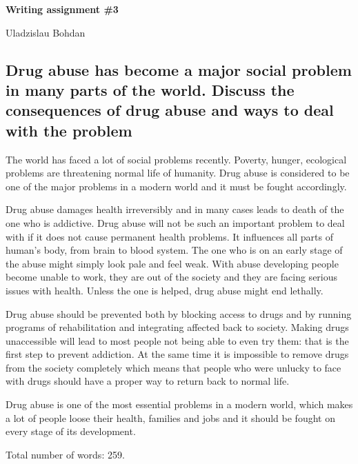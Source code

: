 \documentclass[12pt]{article}
\begin{document}
{\Large

\textbf{Writing assignment \#3}

Uladzislau Bohdan

}

\vspace{10mm}

\subsection*{Drug abuse has become a major social problem in many parts of the
world. Discuss the consequences of drug abuse and ways to deal with the problem}

The world has faced a lot of social problems recently. Poverty, hunger, ecological
problems are threatening normal life of humanity. Drug abuse is considered to be one
of the major problems in a modern world and it must be fought accordingly.

Drug abuse damages health irreversibly and in many cases leads to death of
the one who is addictive. Drug abuse will not be such an important problem
to deal with if it does not cause permanent health problems. It influences all
parts of human's body, from brain to blood system. The one who is on an early
stage of the abuse might simply look pale and feel weak. With abuse developing
people become unable to work, they are out of the society and they are facing
serious issues with health. Unless the one is helped, drug abuse might end lethally.

Drug abuse should be prevented both by blocking access to drugs and by running
programs of rehabilitation and integrating affected back to society.
Making drugs unaccessible will lead to most people not being able to even try
them: that is the first step to prevent addiction. At the same time it is
impossible to remove drugs from the society completely which means that
people who were unlucky to face with drugs should have a proper way to return back
to normal life.

Drug abuse is one of the most essential problems in a modern world, which makes
a lot of people loose their health, families and jobs and it should be fought
on every stage of its development.

\vspace{15mm}

Total number of words: 259.
\end{document}
